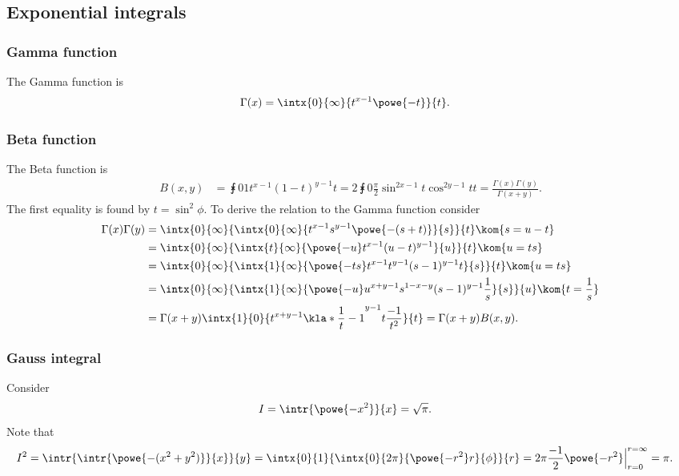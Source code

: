 \documentclass[english, parskip=full]{scrartcl}
\begin{document}
\subsection{Exponential integrals}
\subsubsection{Gamma function}
The Gamma function is
\begin{align}
\Gamma(x) &= \intx{0}{\infty}{t^{x-1} \powe{-t}}{t}. \label{eqn:gamma function}
\end{align}
\subsubsection{Beta function}
The Beta function is
\begin{align}
B(x,y) &= \intx{0}{1}{t^{x-1} (1 - t)^{y-1}}{t} = 2\intx{0}{\frac{\pi}{2}}{\sin^{2x-1}t \cos^{2y-1} t}{t} =  \frac{\Gamma(x)\Gamma(y)}{\Gamma(x+y)}. \label{eqn:beta function}
\end{align}
The first equality is found by $t = \sin^2 \phi$.
To derive the relation to the Gamma function consider
\begin{align}
\Gamma(x) \Gamma(y) &= \intx{0}{\infty}{ \intx{0}{\infty}{ t^{x-1} s^{y-1} \powe{-(s+t)}}{s}}{t} \kom{s = u - t} \\
&= \intx{0}{\infty}{\intx{t}{\infty}{ \powe{-u} t^{x-1} (u - t)^{y-1} }{u}}{t} \kom{u = ts} \\
&= \intx{0}{\infty}{ \intx{1}{\infty}{ \powe{-ts} t^{x-1} t^{y-1} (s - 1)^{y-1} t}{s} }{t} \kom{u = ts} \\
&= \intx{0}{\infty}{ \intx{1}{\infty}{ \powe{-u} u^{x+y-1} s^{1-x-y} (s-1)^{y-1} \frac{1}{s} }{s} }{u} \kom{t = \frac{1}{s}} \\
&= \Gamma(x+y) \intx{1}{0}{ t^{x+y-1} \kla*{\frac{1}{t} - 1}^{y-1} t \frac{-1}{t^2} }{t} = \Gamma(x+y) B(x,y).
\end{align}
\subsubsection{Gauss integral}
Consider
\begin{align}
I &= \intr{\powe{-x^2}}{x} = \sqrt{\pi}. \label{eqn:e to the minus x squared}
\end{align}
Note that
\begin{align}
I^2 &= \intr{\intr{ \powe{-(x^2+y^2)}}{x}}{y} = \intx{0}{1}{\intx{0}{2\pi}{ \powe{-r^2} r}{\phi}}{r} = 2\pi \frac{-1}{2} \powe{-r^2}\Big\vert_{r=0}^{r=\infty} = \pi.
\end{align}
\end{document}
